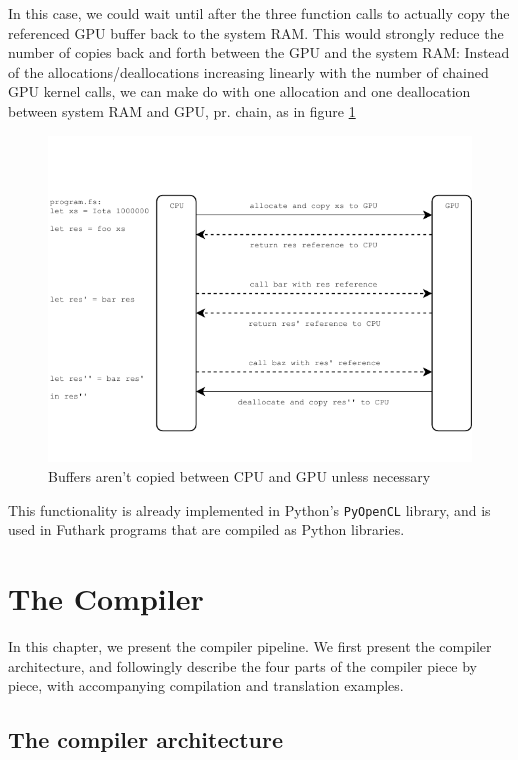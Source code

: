 In this case, we could wait until after the three function calls to actually
copy the referenced GPU buffer back to the system RAM. This would strongly reduce the
number of copies back and forth between the GPU and the system RAM:
Instead of the allocations/deallocations increasing linearly with the number of
chained GPU kernel calls, we can make do with one allocation and one
deallocation between system RAM and GPU, pr. chain, as in figure \ref{fig:withoutarraycopying}
\begin{figure}[H]
  \centering
  \includegraphics[scale=1.15]{chapters/figs/withoutarraycopying.pdf}
  \caption{Buffers aren't copied between CPU and GPU unless necessary}
  \label{fig:withoutarraycopying}
\end{figure}

This functionality is already implemented in Python's \texttt{PyOpenCL} library,
and is used in Futhark programs that are compiled as Python libraries.
\clearpage

\chapter{The \fshark{} Compiler}
\label{chap:fsharkcompiler}
In this chapter, we present the \fshark{} compiler pipeline.
We first present the compiler architecture, and followingly describe the four
parts of the compiler piece by piece, with accompanying compilation and
translation examples.

\section{The \fshark{} compiler architecture}

